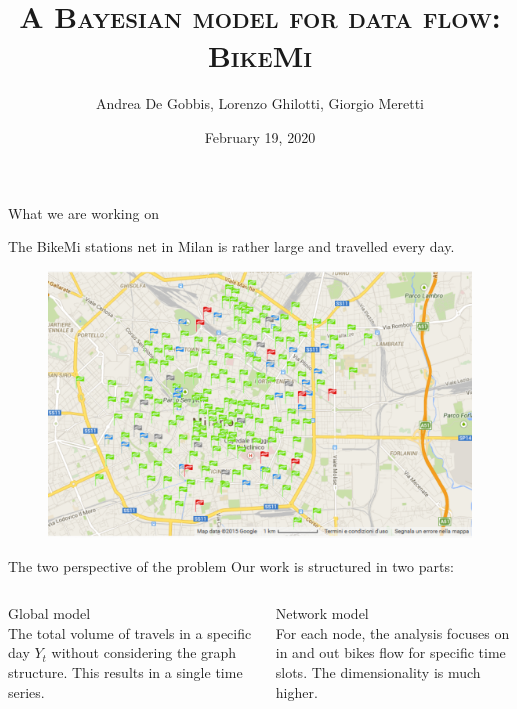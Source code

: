 \documentclass{beamer}
\title{\textsc{A Bayesian model for data flow: BikeMi}}
\subtitle{}
\author{Andrea De Gobbis, Lorenzo Ghilotti, Giorgio Meretti}
\institute{Politecnico di Milano}
\date{February 19, 2020}
\begin{document}
\begin{frame}
 \maketitle
\end{frame}

\begin{frame}{What we are working on}

The BikeMi stations net in Milan is rather large and travelled every day.
\begin{figure}[H]
\centering
\includegraphics[width=1\linewidth]{pictures/mappa.png} 
\end{figure}

\end{frame}

\begin{frame}{The two perspective of the problem}
	Our work is structured in two parts:

\vspace{5mm}

\begin{columns}

\begin{column}{.5\textwidth}

	\alert{Global model} \\
The total volume of travels in a specific day $Y_t$ without considering the graph structure. This results in a single time series.

\end{column}

\hspace{5pt}

\vrule{}

\hspace{8pt}

\begin{column}{.5\textwidth}
	
	\alert{Network model}\\
For each node, the analysis focuses on in and out bikes flow for specific time slots. The dimensionality is much higher.
	
\end{column}

\end{columns}
\end{frame}
\end{document}
